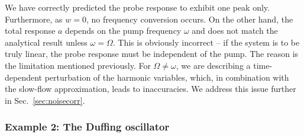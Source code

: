 We have correctly predicted the probe response to exhibit one peak only. Furthermore, as $w = 0$, no frequency conversion occurs. On the other hand, the total response $a$ depends on the pump frequency $\omega$ and does not match the analytical result unless $\omega = \Omega$. This is obviously incorrect -- if the system is to be truly linear, the probe response must be independent of the pump. The reason is the limitation mentioned previously. For $\Omega \neq \omega$, we are describing a time-dependent perturbation of the harmonic variables, which, in combination with the slow-flow approximation, leads to inaccuracies. We address this issue further in Sec.~\ref{sec:noisecorr}.

\subsubsection{Example 2: The Duffing oscillator}

